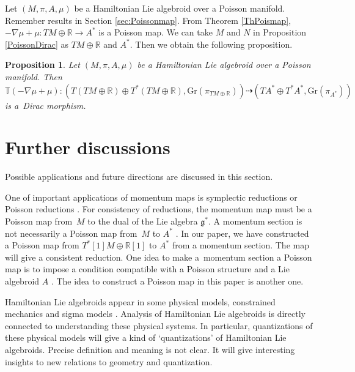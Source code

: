 \documentclass[10pt,a4paper]{amsart}
\numberwithin{equation}{section}
\newtheorem{Proposition}[Theorem]{Proposition}
 { \theoremstyle{definition}
\newtheorem{Definition}[Theorem]{Definition}
\newtheorem{Note}[Theorem]{Note}
\newtheorem{Example}[Theorem]{Example}
\newtheorem{Remark}[Theorem]{Remark}
\newtheorem{Question}[Theorem]{Question}
 }
\def\bR{{\mathbb{R}}}
\newcommand{\bbT}{{\mathbb{T}}}
\begin{document}
Let $(M, \pi, A, \mu)$ be a Hamiltonian Lie algebroid over a Poisson manifold.
Remember results in Section \ref{sec:Poissonmap}.
From Theorem \ref{ThPoismap},
$-\nabla \mu + \mu\colon TM \oplus \bR \rightarrow A^*$
is a Poisson map.
We can take $M$ and $N$ in Proposition \ref{PoissonDirac}
as $TM \oplus \bR$ and $A^*$. Then we obtain the following proposition.
\begin{Proposition}\label{Diracmorphism}
Let $(M, \pi, A, \mu)$ be a Hamiltonian Lie algebroid over a Poisson manifold.
Then
$\bbT (-\nabla \mu + \mu)\colon (T(TM \oplus \bR) \oplus T^*(TM \oplus \bR),
\mathrm{Gr}(\pi_{TM \oplus \bR}))
\dashrightarrow (TA^* \oplus T^*A^*, \mathrm{Gr}(\pi_{A^*}))$
is a~Dirac morphism.
\end{Proposition}

\section{Further discussions}
Possible applications and future directions are discussed in this section.

One of important applications of momentum maps is symplectic reductions \cite{MarsdenWeinstein, Meyer} or Poisson reductions \cite{MarsdenRatiu}.
For consistency of reductions, the momentum map must be a Poisson map from~$M$ to the dual of the Lie algebra $\mathfrak{g}^*$.
A momentum section is not necessarily a Poisson map from~$M$ to $A^*$
\cite{Blohmann:2023}.
In our paper, we have constructed a Poisson map from $T^*[1]M \oplus \bR[1]$
to $A^*$ from a momentum section. The map will give a consistent reduction.
One idea to make a~momentum section a Poisson map is to impose a condition compatible with a Poisson structure and a Lie algebroid $A$ \cite{Hirota:2023xqd}.
The idea to construct a Poisson map in this paper is another one.

Hamiltonian Lie algebroids appear in some physical models, constrained mechanics and sigma models \cite{Ikeda:2019pef}. Analysis of Hamiltonian Lie algebroids is directly connected to understanding these physical systems.
In particular, quantizations of these physical models will give a kind of `quantizations' of Hamiltonian Lie algebroids. Precise definition and meaning is not clear. It will give interesting insights to new relations to geometry and quantization.
\end{document}
